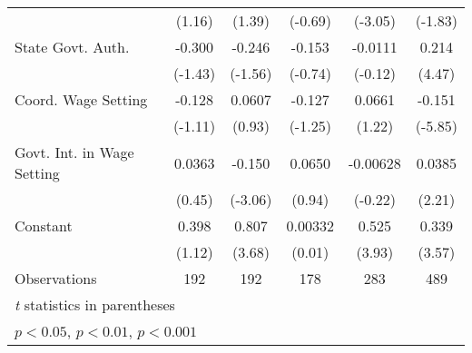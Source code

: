 \begin{table}[htbp]
\begin{tabular}{l*{5}{c}}
                                        &   (1.16)         &   (1.39)         &  (-0.69)         &  (-3.05)         &  (-1.83)         \\
\addlinespace
State Govt. Auth.                       &   -0.300         &   -0.246         &   -0.153         &  -0.0111         &    0.214\sym{***}\\
                                        &  (-1.43)         &  (-1.56)         &  (-0.74)         &  (-0.12)         &   (4.47)         \\
\addlinespace
Coord. Wage Setting                     &   -0.128         &   0.0607         &   -0.127         &   0.0661         &   -0.151\sym{***}\\
                                        &  (-1.11)         &   (0.93)         &  (-1.25)         &   (1.22)         &  (-5.85)         \\
\addlinespace
Govt. Int. in Wage Setting              &   0.0363         &   -0.150\sym{**} &   0.0650         & -0.00628         &   0.0385\sym{*}  \\
                                        &   (0.45)         &  (-3.06)         &   (0.94)         &  (-0.22)         &   (2.21)         \\
\addlinespace
Constant                                &    0.398         &    0.807\sym{***}&  0.00332         &    0.525\sym{***}&    0.339\sym{***}\\
                                        &   (1.12)         &   (3.68)         &   (0.01)         &   (3.93)         &   (3.57)         \\
\midrule
Observations                            &      192         &      192         &      178         &      283         &      489         \\
\bottomrule
\multicolumn{6}{l}{\footnotesize \textit{t} statistics in parentheses}\\
\multicolumn{6}{l}{\footnotesize \sym{*} \(p<0.05\), \sym{**} \(p<0.01\), \sym{***} \(p<0.001\)}\\
\end{tabular}
\end{table}
